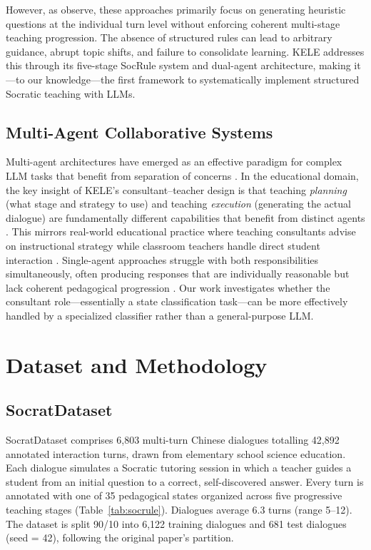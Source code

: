 \documentclass[11pt]{article}
\begin{document}
However, as \citet{peng2025kele} observe, these approaches primarily focus on generating heuristic questions at the individual turn level without enforcing coherent multi-stage teaching progression. The absence of structured rules can lead to arbitrary guidance, abrupt topic shifts, and failure to consolidate learning. KELE addresses this through its five-stage SocRule system and dual-agent architecture, making it---to our knowledge---the first framework to systematically implement structured Socratic teaching with LLMs.

\subsection{Multi-Agent Collaborative Systems}

Multi-agent architectures have emerged as an effective paradigm for complex LLM tasks that benefit from separation of concerns \citep{ge2023openagi}. In the educational domain, the key insight of KELE's consultant--teacher design is that teaching \emph{planning} (what stage and strategy to use) and teaching \emph{execution} (generating the actual dialogue) are fundamentally different capabilities that benefit from distinct agents \citep{peng2025kele}. This mirrors real-world educational practice where teaching consultants advise on instructional strategy while classroom teachers handle direct student interaction \citep{nevin2009collaborative}. Single-agent approaches struggle with both responsibilities simultaneously, often producing responses that are individually reasonable but lack coherent pedagogical progression \citep{an2024llmcontext}. Our work investigates whether the consultant role---essentially a state classification task---can be more effectively handled by a specialized classifier rather than a general-purpose LLM.

\section{Dataset and Methodology}

\subsection{SocratDataset}

SocratDataset \citep{peng2025kele} comprises 6,803 multi-turn Chinese dialogues totalling 42,892 annotated interaction turns, drawn from elementary school science education. Each dialogue simulates a Socratic tutoring session in which a teacher guides a student from an initial question to a correct, self-discovered answer. Every turn is annotated with one of 35 pedagogical states organized across five progressive teaching stages (Table~\ref{tab:socrule}). Dialogues average 6.3 turns (range 5--12). The dataset is split 90/10 into 6,122 training dialogues and 681 test dialogues (seed = 42), following the original paper's partition.
\end{document}
